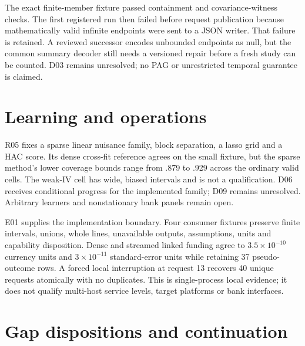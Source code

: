 \documentclass[11pt,a4paper]{article}
\begin{document}
The exact finite-member fixture passed containment and covariance-witness
checks. The first registered run then failed before request publication
because mathematically valid infinite endpoints were sent to a JSON writer.
That failure is retained. A reviewed successor encodes unbounded endpoints as
null, but the common summary decoder still needs a versioned repair before a
fresh study can be counted. D03 remains unresolved; no PAG or unrestricted
temporal guarantee is claimed.

\section{Learning and operations}

R05 fixes a sparse linear nuisance family, block separation, a lasso grid and
a HAC score. Its dense cross-fit reference agrees on the small fixture, but
the sparse method's lower coverage bounds range from .879 to .929 across the
ordinary valid cells. The weak-IV cell has wide, biased intervals and is not a
qualification. D06 receives conditional progress for the implemented family;
D09 remains unresolved. Arbitrary learners and nonstationary bank panels
remain open.

E01 supplies the implementation boundary. Four consumer fixtures preserve
finite intervals, unions, whole lines, unavailable outputs, assumptions,
units and capability disposition. Dense and streamed linked funding agree to
$3.5\times10^{-10}$ currency units and $3\times10^{-11}$ standard-error
units while retaining 37 pseudo-outcome rows. A forced local interruption at
request 13 recovers 40 unique requests atomically with no duplicates. This is
single-process local evidence; it does not qualify multi-host service levels,
target platforms or bank interfaces.

\section{Gap dispositions and continuation}
\end{document}
